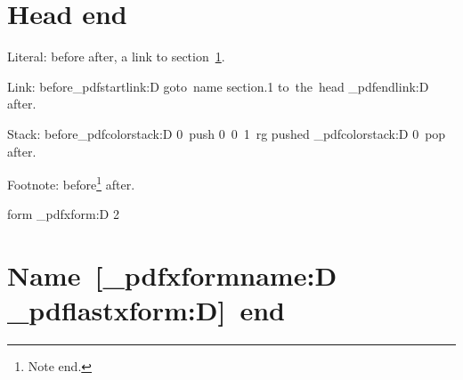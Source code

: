 \documentclass{article}
\begin{document}
\tableofcontents

\section{Head  end}\label{head}

Literal: before  after, a link to section~\ref{head}.

Link: before\ExplSyntaxOn \tex_pdfstartlink:D goto~name {section.1} to~the~head
\tex_pdfendlink:D \ExplSyntaxOff{} after.

Stack: before\ExplSyntaxOn \tex_pdfcolorstack:D 0~push {0~0~1~rg} pushed
\tex_pdfcolorstack:D 0~pop \ExplSyntaxOff{} after.

Footnote: before\footnote{Note  end.} after.

\hbox{form}%
\ExplSyntaxOn \tex_pdfxform:D 2 \ExplSyntaxOff
\ExplSyntaxOn
\section{Name~[\tex_pdfxformname:D \tex_pdflastxform:D]~end}
\ExplSyntaxOff
\end{document}
